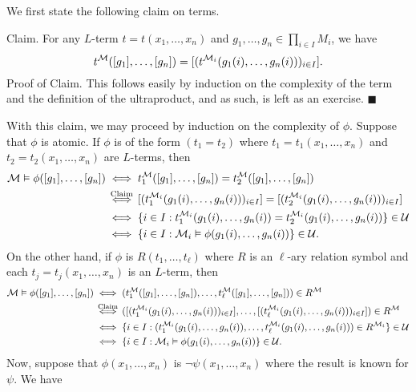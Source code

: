 \documentclass[10pt]{article}
\makeatletter
\theoremstyle{newstyle}
\newenvironment{pf}[1][\proofname]{\par
  \pushQED{\qed}%
  \normalfont \topsep0\p@\relax
  \trivlist
  \item[\hskip\labelsep\scshape
  #1\@addpunct{.}]\ignorespaces
}{%
  \popQED\endtrivlist\@endpefalse
}
\makeatother
\begin{document}
\begin{pf}
We first state the following claim on terms. 

{\sc Claim.} For any $L$-term $t = t(x_1, \dots, x_n)$ and $g_1, \dots, g_n \in \prod_{i \in I} 
M_i$, we have 
\[ t^{\cal M}([g_1], \dots, [g_n]) = [(t^{{\cal M}_i}(g_1(i), \dots, g_n(i)))_{i \in I}]. \]
{\sc Proof of Claim.} This follows easily by induction on the complexity of the term 
and the definition of the ultraproduct, and as such, is left as an exercise. \hfill $\blacksquare$

With this claim, we may proceed by induction on the complexity of $\phi$. Suppose that $\phi$ is 
atomic. If $\phi$ is of the form $(t_1 = t_2)$ where $t_1 = t_1(x_1, \dots, x_n)$ and 
$t_2 = t_2(x_1, \dots, x_n)$ are $L$-terms, then 
\begin{align*}
    {\cal M} \vDash \phi([g_1], \dots, [g_n]) 
    &\iff t_1^{\cal M}([g_1], \dots, [g_n]) = t_2^{\cal M}([g_1], \dots, [g_n]) \\
    &\overset{\text{Claim}}{\iff} [(t_1^{{\cal M}_i}(g_1(i), \dots, g_n(i)))_{i \in I}] = [(t_2^{{\cal M}_i}(g_1(i), \dots, g_n(i)))_{i \in I}] \\
    &\iff \{i \in I : t_1^{{\cal M}_i}(g_1(i), \dots, g_n(i)) = t_2^{{\cal M}_i}(g_1(i), 
    \dots, g_n(i))\} \in {\cal U} \\
    &\iff \{i \in I : {\cal M}_i \vDash \phi(g_1(i), \dots, g_n(i))\} \in {\cal U}.
\end{align*}
On the other hand, if $\phi$ is $R(t_1, \dots, t_\ell)$ where $R$ is an $\ell$-ary relation symbol
and each $t_j = t_j(x_1, \dots, x_n)$ is an $L$-term, then 
\begin{align*}
    {\cal M} \vDash \phi([g_1], \dots, [g_n]) 
    &\iff (t_1^{\cal M}([g_1], \dots, [g_n]), \dots, t_\ell^{\cal M}([g_1], \dots, [g_n])) \in R^{\cal M} \\
    &\overset{\text{Claim}}{\iff} ([(t_1^{{\cal M}_i}(g_1(i), \dots, g_n(i)))_{i\in I}], \dots, 
    [(t_\ell^{{\cal M}_i}(g_1(i), \dots, g_n(i)))_{i\in I}]) \in R^{\cal M} \\
    &\iff \{i \in I : (t_1^{{\cal M}_i}(g_1(i), \dots, g_n(i)), \dots, t_\ell^{{\cal M}_i}
    (g_1(i), \dots, g_n(i))) \in R^{{\cal M}_i}\} \in {\cal U} \\
    &\iff \{i \in I : {\cal M}_i \vDash \phi(g_1(i), \dots, g_n(i))\} \in {\cal U}.
\end{align*}
Now, suppose that $\phi(x_1, \dots, x_n)$ is $\neg \psi(x_1, \dots, x_n)$ where the result is known for 
$\psi$. We have 

\end{pf}
\end{document}
